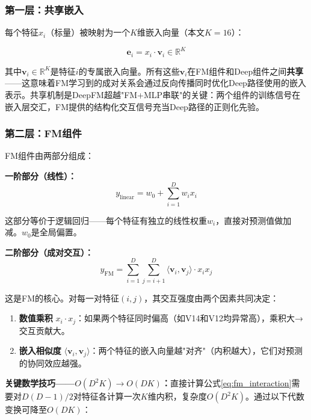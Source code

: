\subsubsection{第一层：共享嵌入}

每个特征$x_i$（标量）被映射为一个$K$维嵌入向量（本文$K=16$）：

\begin{equation}
\mathbf{e}_i = x_i \cdot \mathbf{v}_i \in \mathbb{R}^{K}
\label{eq:deepfm_embed}
\end{equation}

其中$\mathbf{v}_i \in \mathbb{R}^{K}$是特征$i$的专属嵌入向量。所有这些$\mathbf{v}_i$在FM组件和Deep组件之间\textbf{共享}——这意味着FM学习到的成对关系会通过反向传播同时优化Deep路径使用的嵌入表示。共享机制是DeepFM超越"FM+MLP串联"的关键：两个组件的训练信号在嵌入层交汇，FM提供的结构化交互信号充当Deep路径的正则化先验。

\subsubsection{第二层：FM组件}

FM组件由两部分组成：

\textbf{一阶部分（线性）：}
\begin{equation}
y_{\mathrm{linear}} = w_0 + \sum_{i=1}^{D} w_i x_i
\end{equation}

这部分等价于逻辑回归——每个特征有独立的线性权重$w_i$，直接对预测值做加减。$w_0$是全局偏置。

\textbf{二阶部分（成对交互）：}
\begin{equation}
y_{\mathrm{FM}} = \sum_{i=1}^{D} \sum_{j=i+1}^{D} \langle \mathbf{v}_i, \mathbf{v}_j \rangle \cdot x_i x_j
\label{eq:fm_interaction}
\end{equation}

这是FM的核心。对每一对特征$(i, j)$，其交互强度由两个因素共同决定：
\begin{enumerate}
    \item \textbf{数值乘积} $x_i \cdot x_j$：如果两个特征同时偏高（如V14和V12均异常高），乘积大→交互贡献大。
    \item \textbf{嵌入相似度} $\langle \mathbf{v}_i, \mathbf{v}_j \rangle$：两个特征的嵌入向量越"对齐"（内积越大），它们对预测的协同效应越强。
\end{enumerate}

\textbf{关键数学技巧——$O(D^2K) \to O(DK)$：}直接计算公式\eqref{eq:fm_interaction}需要对$D(D-1)/2$对特征各计算一次$K$维内积，复杂度$O(D^2K)$。通过以下代数变换可降至$O(DK)$：

